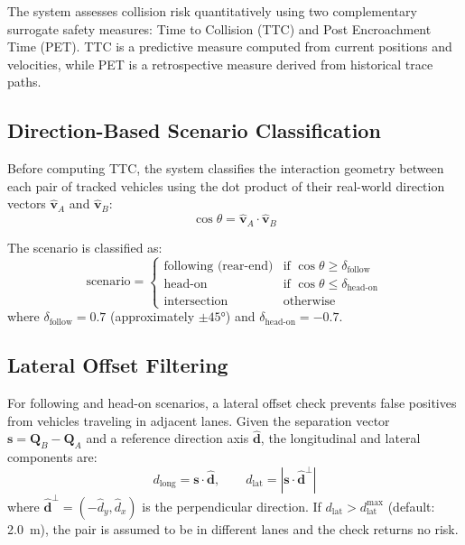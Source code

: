 \documentclass[12pt]{report}
\begin{document}
The system assesses collision risk quantitatively using two complementary surrogate safety measures: Time to Collision (TTC) and Post Encroachment Time (PET).
TTC is a predictive measure computed from current positions and velocities, while PET is a retrospective measure derived from historical trace paths.

\subsection{Direction-Based Scenario Classification}

Before computing TTC, the system classifies the interaction geometry between each pair of tracked vehicles using the dot product of their real-world direction vectors $\hat{\mathbf{v}}_A$ and $\hat{\mathbf{v}}_B$:
\begin{equation}
    \cos\theta = \hat{\mathbf{v}}_A \cdot \hat{\mathbf{v}}_B
    \label{eq:dot_scenario}
\end{equation}

The scenario is classified as:
\begin{equation}
    \text{scenario} =
    \begin{cases}
        \text{following (rear-end)} & \text{if } \cos\theta \geq \delta_\text{follow} \\
        \text{head-on} & \text{if } \cos\theta \leq \delta_\text{head-on} \\
        \text{intersection} & \text{otherwise}
    \end{cases}
    \label{eq:scenario_class}
\end{equation}
where $\delta_\text{follow} = 0.7$ (approximately $\pm 45°$) and $\delta_\text{head-on} = -0.7$.

\subsection{Lateral Offset Filtering}

For following and head-on scenarios, a lateral offset check prevents false positives from vehicles traveling in adjacent lanes.
Given the separation vector $\mathbf{s} = \mathbf{Q}_B - \mathbf{Q}_A$ and a reference direction axis $\hat{\mathbf{d}}$, the longitudinal and lateral components are:
\begin{equation}
    d_\text{long} = \mathbf{s} \cdot \hat{\mathbf{d}}, \qquad
    d_\text{lat} = |\mathbf{s} \cdot \hat{\mathbf{d}}^\perp|
    \label{eq:lateral_offset}
\end{equation}
where $\hat{\mathbf{d}}^\perp = (-\hat{d}_y, \hat{d}_x)$ is the perpendicular direction.
If $d_\text{lat} > d_\text{lat}^\text{max}$ (default: 2.0~m), the pair is assumed to be in different lanes and the check returns no risk.
\end{document}
